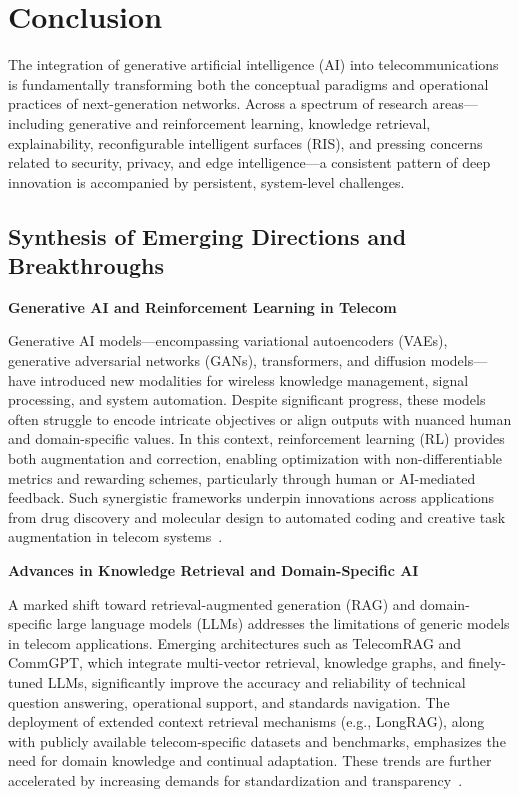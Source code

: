\documentclass[sigconf]{acmart}
\begin{document}
\section{Conclusion}

The integration of generative artificial intelligence (AI) into telecommunications is fundamentally transforming both the conceptual paradigms and operational practices of next-generation networks. Across a spectrum of research areas—including generative and reinforcement learning, knowledge retrieval, explainability, reconfigurable intelligent surfaces (RIS), and pressing concerns related to security, privacy, and edge intelligence—a consistent pattern of deep innovation is accompanied by persistent, system-level challenges.

\subsection{Synthesis of Emerging Directions and Breakthroughs}

\textbf{Generative AI and Reinforcement Learning in Telecom}

Generative AI models—encompassing variational autoencoders (VAEs), generative adversarial networks (GANs), transformers, and diffusion models—have introduced new modalities for wireless knowledge management, signal processing, and system automation. Despite significant progress, these models often struggle to encode intricate objectives or align outputs with nuanced human and domain-specific values. In this context, reinforcement learning (RL) provides both augmentation and correction, enabling optimization with non-differentiable metrics and rewarding schemes, particularly through human or AI-mediated feedback. Such synergistic frameworks underpin innovations across applications from drug discovery and molecular design to automated coding and creative task augmentation in telecom systems~\cite{ref1, ref2, ref3, ref4, ref5, ref6}.

\textbf{Advances in Knowledge Retrieval and Domain-Specific AI}

A marked shift toward retrieval-augmented generation (RAG) and domain-specific large language models (LLMs) addresses the limitations of generic models in telecom applications. Emerging architectures such as TelecomRAG and CommGPT, which integrate multi-vector retrieval, knowledge graphs, and finely-tuned LLMs, significantly improve the accuracy and reliability of technical question answering, operational support, and standards navigation. The deployment of extended context retrieval mechanisms (e.g., LongRAG), along with publicly available telecom-specific datasets and benchmarks, emphasizes the need for domain knowledge and continual adaptation. These trends are further accelerated by increasing demands for standardization and transparency~\cite{ref13, ref14, ref15, ref16, ref17, ref18, ref19, ref20}.
\end{document}
